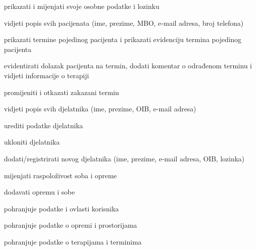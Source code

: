 \begin{packed_enum}
				\item  {}
				\begin{packed_enum}
					\item prikazati i mijenjati svoje osobne podatke i lozinku
					\item vidjeti popis svih pacijenata (ime, prezime, MBO, e-mail adresa, broj telefona)
					\item prikazati termine pojedinog pacijenta i prikazati evidenciju termina pojedinog pacijenta
					\item evidentirati dolazak pacijenta na termin, dodati komentar o odrađenom terminu i vidjeti informacije o terapiji
					\item promijeniti i otkazati zakazani termin
				\end{packed_enum}
				\item  {}
				\begin{packed_enum}
					
					\item vidjeti popis svih djelatnika (ime, prezime, OIB, e-mail adresa)
					\item urediti podatke djelatnika
					\item ukloniti djelatnika
					\item dodati/registrirati novog djelatnika (ime, prezime, e-mail adresa, OIB, lozinka)
					\item mijenjati raspoloživost soba i opreme
					\item dodavati opremu i sobe
					
				\end{packed_enum}
				
				\item  {}
				\begin{packed_enum}
					
					\item pohranjuje podatke i ovlasti korisnika
					\item pohranjuje podatke o opremi i prostorijama
					\item pohranjuje podatke o terapijama i terminima
					
				\end{packed_enum}
			\end{packed_enum}
			
			\eject 
			
			
				
